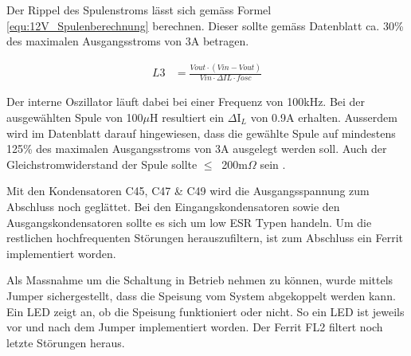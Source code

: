 Der Rippel des Spulenstroms lässt sich gemäss Formel \ref{equ:12V_Spulenberechnung} berechnen. Dieser sollte gemäss Datenblatt ca. 30\% des maximalen Ausgangsstroms von 3A betragen. 

\begin{align}
L3 &= \frac{Vout \cdot (Vin-Vout)}{Vin \cdot \Delta IL \cdot fosc}
\label{equ:12V_Spulenberechnung}
\end{align}

Der interne Oszillator läuft dabei bei einer Frequenz von 100kHz. Bei der ausgewählten Spule von 100$\mu$H resultiert ein $\Delta$I$_{L}$ von 0.9A erhalten. Ausserdem wird im Datenblatt darauf hingewiesen, dass die gewählte Spule auf mindestens 125\% des maximalen Ausgangsstroms von 3A ausgelegt werden soll. Auch der Gleichstromwiderstand der Spule sollte $ \leq \ $ 200m$\Omega$  sein \cite[S.8-10]{monolithic_power_systems_mp24943_2011}.

Mit den Kondensatoren C45, C47 \& C49 wird die Ausgangsspannung zum Abschluss noch geglättet. Bei den Eingangskondensatoren sowie den Ausgangskondensatoren sollte es sich um low ESR Typen handeln. Um die restlichen hochfrequenten Störungen herauszufiltern, ist zum Abschluss ein Ferrit implementiert worden. 

Als Massnahme um die Schaltung in Betrieb nehmen zu können, wurde mittels Jumper sichergestellt, dass die Speisung vom System abgekoppelt werden kann. Ein LED zeigt an, ob die Speisung funktioniert oder nicht. So ein LED ist jeweils vor und nach dem Jumper implementiert worden. Der Ferrit FL2 filtert noch letzte Störungen heraus.


